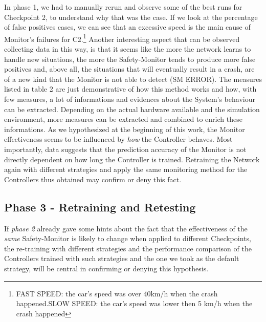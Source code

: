 In phase 1, we had to manually rerun and observe some of the best runs for Checkpoint 2, to understand why that was the case. If we look at the percentage of false positives cases, we can see that an excessive speed is the main cause of Monitor's failures for C2.\footnote{FAST SPEED: the car's speed was over 40km/h when the crash happened.\newline SLOW SPEED: the car's speed was lower then 5 km/h when the crash happened}
Another interesting aspect that can be observed collecting data in this way, is that it seems like the more the network learns to handle new situations, the more the Safety-Monitor tends to produce more false positives and, above all, the situations that will eventually result in a crash, are of a new kind that the Monitor is not able to detect (SM ERROR).\newline
The measures listed in table 2 are just demonstrative of how this method works and how, with few measures, a lot of informations and evidences about the System's behaviour can be extracted. Depending on the actual hardware available and the simulation environment, more measures can be extracted and combined to enrich these informations.\newline
As we hypothesized at the beginning of this work, the Monitor effectiveness seems to be influenced by \textsl{how} the Controller behaves. Most importantly, data suggests that the prediction accuracy of the Monitor is not directly dependent on how long the Controller is trained. Retraining the Network again with different strategies and apply the same monitoring method for the Controllers thus obtained may confirm or deny this fact.

\subsection{Phase 3 - Retraining and Retesting}

If \textsl{phase 2} already gave some hints about the fact that the effectiveness of the \textsl{same} Safety-Monitor is likely to change when applied to different Checkpoints, the re-training with different strategies and the performance comparison of the Controllers trained with such strategies and the one we took as the default strategy, will be central in confirming or denying this hypothesis.


